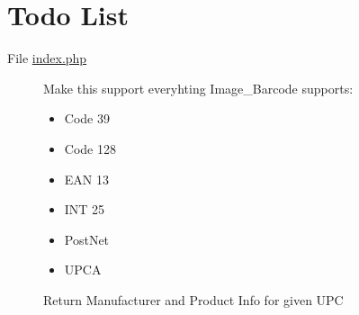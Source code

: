 \hypertarget{todo}{}\section{Todo List}\label{todo}
\label{todo__todo000001}
\hypertarget{todo__todo000001}{}
 \begin{description}
\item[File \hyperlink{index_8php}{index.php} ]Make this support everyhting Image\_\-Barcode supports:\begin{itemize}
\item Code 39\item Code 128\item EAN 13\item INT 25\item PostNet\item UPCA \end{itemize}


Return Manufacturer and Product Info for given UPC \end{description}
